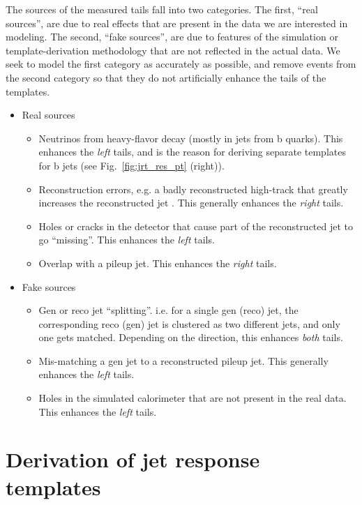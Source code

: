 The sources of the measured tails fall into two categories. The first, ``real sources'', 
are due to real effects that are present in the data we are interested in modeling. 
The second, ``fake sources'', are due to features of the simulation or template-derivation 
methodology that are not reflected in the actual data. 
We seek to model the first category as accurately as possible, 
and remove events from the second category so that
they do not artificially enhance the tails of the templates.
\begin{itemize}
\item{Real sources}
   \begin{itemize}
   \item Neutrinos from heavy-flavor decay (mostly in jets from b quarks). This enhances the \emph{left} tails, and is the
   reason for deriving separate templates for b jets (see Fig.~\ref{fig:jrt_res_pt} (right)).
   \item Reconstruction errors, e.g. a badly reconstructed high-\pt track that greatly increases the reconstructed jet \pt. This generally enhances the \emph{right} tails.
   \item Holes or cracks in the detector that cause part of the reconstructed jet to go ``missing''. This enhances the \emph{left} tails.
   \item Overlap with a pileup jet. This enhances the \emph{right} tails.
   \end{itemize}
\item{Fake sources}
   \begin{itemize}
   \item Gen or reco jet ``splitting''. i.e. for a single gen (reco) jet, the corresponding reco (gen) jet is clustered as two different jets, and only one gets matched. 
   Depending on the direction, this enhances \emph{both} tails.
   \item Mis-matching a gen jet to a reconstructed pileup jet. This generally enhances the \emph{left} tails.
   \item Holes in the simulated calorimeter that are not present in the real data. This enhances the \emph{left} tails.
   \end{itemize}
\end{itemize}


\section{Derivation of jet response templates}
\label{sec:jrt}


